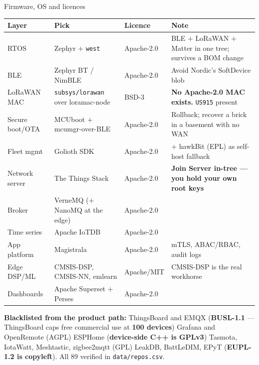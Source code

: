 \documentclass[aspectratio=169,t,10pt,xcolor={table,svgnames}]{beamer}
\newcommand{\hd}[1]{\textbf{\footnotesize #1}}
\begin{document}
\begin{frame}{Firmware, OS and licences}
  \scriptsize
  \begin{tabular}{@{}p{}p{}p{}p{}@{}}
    \toprule
    \hd{Layer} & \hd{Pick} & \hd{Licence} & \hd{Note} \\
    \midrule
    RTOS              & Zephyr $+$ \texttt{west}        & \cellcolor{fill1}Apache-2.0 & BLE $+$ LoRaWAN $+$ Matter in one tree; survives a BOM change \\
    BLE               & Zephyr BT / NimBLE              & \cellcolor{fill1}Apache-2.0 & Avoid Nordic's SoftDevice blob \\
    LoRaWAN MAC       & \texttt{subsys/lorawan} over loramac-node & \cellcolor{fill2}BSD-3 & \textbf{No Apache-2.0 MAC exists.} \texttt{US915} present \\
    Secure boot/OTA   & MCUboot $+$ mcumgr-over-BLE     & \cellcolor{fill1}Apache-2.0 & Rollback; recover a brick in a basement with no WAN \\
    Fleet mgmt        & Golioth SDK                     & \cellcolor{fill1}Apache-2.0 & $+$ hawkBit (EPL) as self-host fallback \\
    Network server    & The Things Stack                & \cellcolor{fill1}Apache-2.0 & \textbf{Join Server in-tree --- you hold your own root keys} \\
    Broker            & VerneMQ ($+$ NanoMQ at the edge)& \cellcolor{fill1}Apache-2.0 & \\
    Time series       & Apache IoTDB                    & \cellcolor{fill1}Apache-2.0 & \\
    App platform      & Magistrala                      & \cellcolor{fill1}Apache-2.0 & mTLS, ABAC/RBAC, audit logs \\
    Edge DSP/ML       & CMSIS-DSP, CMSIS-NN, emlearn     & \cellcolor{fill1}Apache/MIT & CMSIS-DSP is the real workhorse \\
    Dashboards        & Apache Superset $+$ Perses      & \cellcolor{fill1}Apache-2.0 & \\
    \bottomrule
  \end{tabular}
  \vspace{0.5em}
  {\scriptsize\textbf{Blacklisted from the product path:} ThingsBoard and EMQX (\textbf{BUSL-1.1} ---
   ThingsBoard caps free commercial use at \textbf{100 devices}) \textperiodcentered{} Grafana and
   OpenRemote (AGPL) \textperiodcentered{} ESPHome (\textbf{device-side C++ is GPLv3}) \textperiodcentered{}
   Tasmota, IotaWatt, Meshtastic, zigbee2mqtt (GPL) \textperiodcentered{} LeakDB, BattLeDIM, EPyT
   (\textbf{EUPL-1.2 is copyleft}). All 89 verified in \texttt{data/repos.csv}.\par}
\end{frame}
\end{document}
